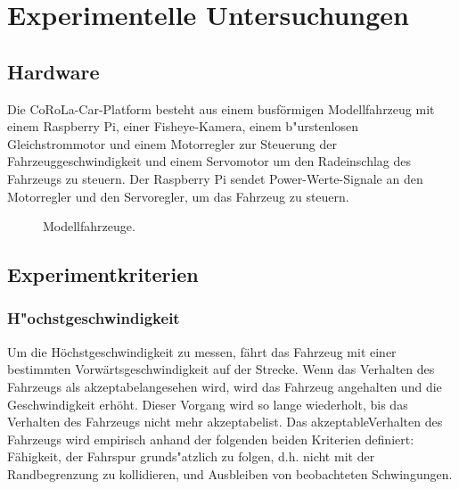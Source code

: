 \documentclass[arbeit=studie,oneside,BCOR=12mm]{ArbeitRST}
\begin{document}
\chapter{Experimentelle Untersuchungen}
\section{Hardware}

Die CoRoLa-Car-Platform besteht aus einem busförmigen Modellfahrzeug mit einem Raspberry Pi, 
einer Fisheye-Kamera,
einem b"urstenlosen Gleichstrommotor und einem Motorregler zur Steuerung der
Fahrzeuggeschwindigkeit und einem Servomotor um den Radeinschlag des Fahrzeugs
zu steuern. Der Raspberry Pi sendet Power-Werte-Signale an den
Motorregler und den Servoregler, um das Fahrzeug zu steuern. 

\begin{figure}[h]
    \centering
    \caption{Modellfahrzeuge.}
    \label{cars}
\end{figure}


\section{Experimentkriterien}

\subsection{H"ochstgeschwindigkeit}

Um die Höchstgeschwindigkeit zu messen, fährt das Fahrzeug mit einer bestimmten
Vorwärtsgeschwindigkeit auf der Strecke. Wenn das Verhalten des Fahrzeugs als
\glqq akzeptabel\grqq angesehen wird, wird das Fahrzeug angehalten und die
Geschwindigkeit erhöht. Dieser Vorgang wird so lange wiederholt, bis das
Verhalten des Fahrzeugs nicht mehr \glqq akzeptabel\grqq ist. Das \glqq
akzeptable\grqq Verhalten des Fahrzeugs wird empirisch anhand der folgenden
beiden Kriterien definiert: Fähigkeit, der Fahrspur grunds"atzlich zu folgen, 
d.h. nicht mit der Randbegrenzung zu kollidieren, und Ausbleiben von
beobachteten Schwingungen.
\end{document}
